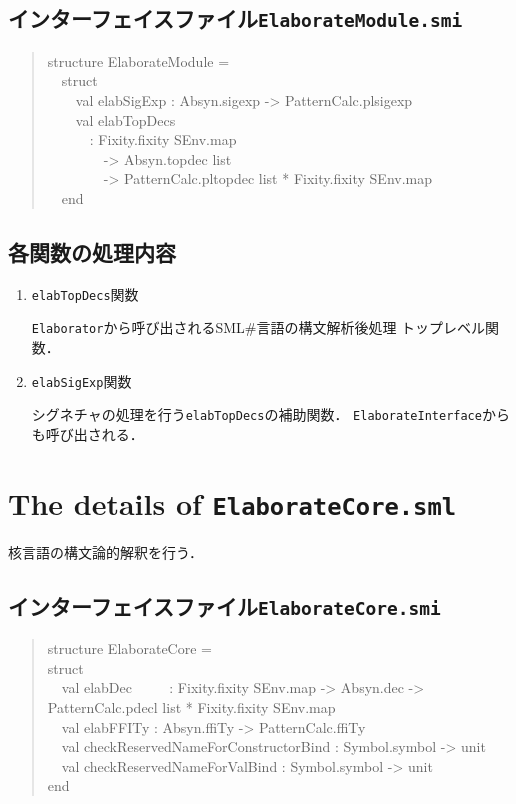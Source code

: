 \documentclass{jbook}
\newif\ifjp
\newcommand{\txt}[2]{#2}
\newcommand{\smlsharp}{SML\#}
\newcommand{\code}[1]{\mbox{\large\tt #1}}
\newcommand{\myem}{\mbox{\ \ }}
\newenvironment{program}{\begin{quote}\begin{tt}}%
                        {\end{tt}\end{quote}}
\begin{document}
\subsection{インターフェイスファイル\code{ElaborateModule.smi}}
\begin{program}
structure ElaborateModule =\\
\myem  struct\\
\myem\myem    val elabSigExp : Absyn.sigexp -> PatternCalc.plsigexp\\
\myem\myem    val elabTopDecs\\
\myem\myem\myem        : Fixity.fixity SEnv.map\\
\myem\myem\myem\myem          -> Absyn.topdec list\\
\myem\myem\myem\myem          -> PatternCalc.pltopdec list * Fixity.fixity SEnv.map\\
\myem  end
\end{program}
\subsection{各関数の処理内容}
\begin{enumerate}
\item \code{elabTopDecs}関数

	\code{Elaborator}から呼び出される\smlsharp{}言語の構文解析後処理
トップレベル関数．

\item \code{elabSigExp}関数

	シグネチャの処理を行う\code{elabTopDecs}の補助関数．
	\code{ElaborateInterface}からも呼び出される．

\end{enumerate}
\else%
\fi%


\section{\txt{\code{ElaborateCore.sml}の処理の詳細}{The details of \code{ElaborateCore.sml}}}
\ifjp%

	核言語の構文論的解釈を行う．

\subsection{インターフェイスファイル\code{ElaborateCore.smi}}
\begin{program}
structure ElaborateCore =\\
struct\\
\myem  val elabDec 
\myem\myem
    : Fixity.fixity SEnv.map -> Absyn.dec -> PatternCalc.pdecl list * Fixity.fixity SEnv.map\\
\myem  val elabFFITy : Absyn.ffiTy -> PatternCalc.ffiTy\\
\myem  val checkReservedNameForConstructorBind : Symbol.symbol -> unit\\
\myem  val checkReservedNameForValBind : Symbol.symbol -> unit\\
end
\end{program}
\end{document}
